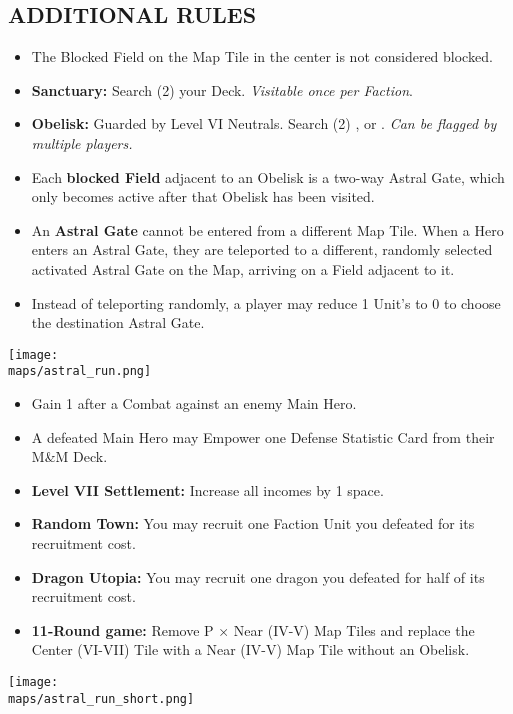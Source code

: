 \begin{multicols*}{2}
\subsection*{\MakeUppercase{Additional Rules}}
\begin{itemize}
  \item The Blocked Field on the Map Tile in the center is not considered blocked.
  \item \textbf{Sanctuary:} Search (2) your Deck. \textit{Visitable once per Faction}.
  \item \textbf{Obelisk:} Guarded by Level VI Neutrals. Search (2) ,  or . \textit{Can be flagged by multiple players.}
  \item Each \textbf{blocked Field} adjacent to an Obelisk is a two-way Astral Gate, which only becomes active after that Obelisk has been visited.
  \item An \textbf{Astral Gate} cannot be entered from a different Map Tile. When a Hero enters an Astral Gate, they are teleported to a different, randomly selected activated Astral Gate on the Map, arriving on a Field adjacent to it.
  \item Instead of teleporting randomly, a player may reduce 1 Unit's  to 0 to choose the destination Astral Gate.
\end{itemize}

\vspace*{\fill}
\begin{center}
  \texttt{[image: \\maps/astral\_run.png]}
\end{center}

\columnbreak

\begin{itemize}
  \item Gain 1  after a Combat against an enemy Main Hero.
  \item A defeated Main Hero may Empower one Defense Statistic Card from their M\&M Deck.
  \item \textbf{Level VII Settlement:} Increase all incomes by 1 space.
  \item \textbf{Random Town:} You may recruit one Faction Unit you defeated for its recruitment cost.
  \item \textbf{Dragon Utopia:} You may recruit one dragon you defeated for half of its recruitment cost.
  \item \textbf{11-Round game:} Remove P × Near (IV-V) Map Tiles and replace the Center (VI-VII) Tile with a Near (IV-V) Map Tile without an Obelisk.
\end{itemize}

\begin{center}
  \hspace*{-2em}\texttt{[image: \\maps/astral\_run\_short.png]}
  \vspace*{-1em}
  \hspace*{2em}
\end{center}
\vspace*{\fill}

\end{multicols*}
